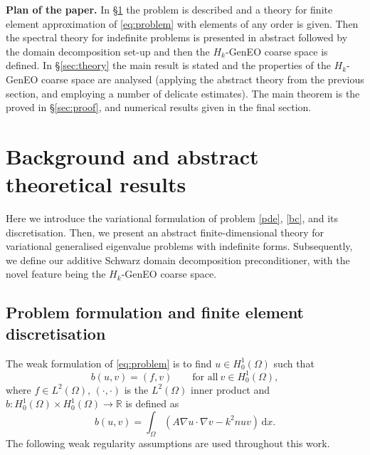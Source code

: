 \documentclass[numbers,webpdf,imaiai]{ima-authoring-template}%
\theoremstyle{thmstyletwo}%
\numberwithin{equation}{section}
\numberwithin{equation}{section}
\newcommand{\rd}{\mathrm{d}}
\renewcommand{\kappa}{k}
\begin{document}
{\vspace{0.1cm}
\noindent 
\textbf{Plan of the paper.}
In \S \ref{sec:useful} the problem is described and a theory for finite element approximation of \eqref{eq:problem} 
with elements of any order is given. 
Then the spectral theory for indefinite problems is presented in abstract followed by the domain decomposition set-up 
and then the $H_k$-GenEO coarse space is defined. In \S \ref{sec:theory} the main result is stated and the properties 
of the $H_k$-GenEO coarse space are analysed (applying the abstract theory from the previous section, and employing a number of delicate estimates). 
The main theorem is the proved in  \S \ref{sec:proof}, and numerical results given in the final section.


\section{Background and abstract theoretical results}
\label{sec:useful} 

Here we introduce the variational formulation of problem \eqref{pde}, \eqref{bc}, and its discretisation. 
Then, we present an abstract finite-dimensional theory for variational generalised eigenvalue problems with indefinite forms.  
Subsequently, we define our additive Schwarz domain decomposition preconditioner, with the novel feature being the $H_k$-GenEO coarse space. 

\subsection{Problem formulation and finite element discretisation}

The weak formulation of \eqref{eq:problem} is to find $u \in H^1_0(\Omega)$ such that 
\begin{equation}
\label{weak_form}
	b(u,v) = (f,v) \qquad \text{for all} \ v \in H^1_0(\Omega),
\end{equation}
where $f \in L^2(\Omega)$, $(\cdot, \cdot)$ is the $L^2(\Omega)$ inner product and $b : H^1_0(\Omega) \times H^1_0(\Omega) \rightarrow \mathbb{R}$ 
is defined as 
\begin{equation*}
	b(u,v) = \int_\Omega (A\nabla u \cdot \nabla v - \kappa^2{n}  uv)\,\rd x.
\end{equation*}
The following weak regularity assumptions are used throughout this work.

}
\end{document}
